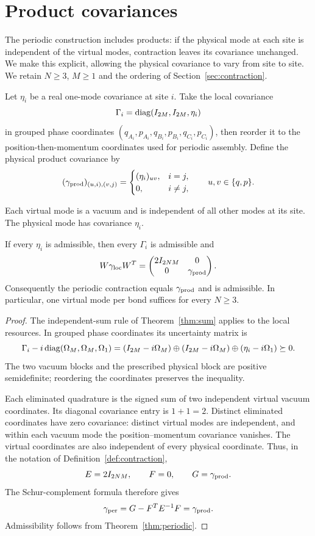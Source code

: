 \section{Product covariances}
\label{sec:products}
The periodic construction includes products: if the physical mode at each site
is independent of the virtual modes, contraction leaves its covariance unchanged.
We make this explicit, allowing the physical covariance to vary from site to site.
We retain $N\geq3$, $M\geq1$ and the ordering of Section~\ref{sec:contraction}.

\begin{definition}\label{def:product-resource}
Let $\eta_i$ be a real one-mode covariance at site $i$. Take the local covariance
\[
 \Gamma_i=\operatorname{diag}(I_{2M},I_{2M},\eta_i)
\]
in grouped phase coordinates $(q_{A_i},p_{A_i},q_{B_i},p_{B_i},q_{C_i},p_{C_i})$,
then reorder it to the position-then-momentum coordinates used for periodic
assembly. Define the physical product covariance by
\[
 (\gamma_{\rm prod})_{(u,i),(v,j)}=
 \begin{cases}(\eta_i)_{uv},&i=j,\\0,&i\ne j,\end{cases}
 \qquad u,v\in\{q,p\}.
\]
\end{definition}
Each virtual mode is a vacuum and is independent of all other modes at its site.
The physical mode has covariance $\eta_i$.

\begin{theorem}\label{thm:periodic-product}
If every $\eta_i$ is admissible, then every $\Gamma_i$ is admissible and
\[
 W\gamma_{\rm loc}W^T=
 \begin{pmatrix}2I_{2NM}&0\\0&\gamma_{\rm prod}\end{pmatrix}.
\]
Consequently the periodic contraction equals $\gamma_{\rm prod}$ and is
admissible. In particular, one virtual mode per bond suffices for every $N\geq3$.
\end{theorem}
\begin{proof}
The independent-sum rule of Theorem~\ref{thm:sum} applies to the local resources.
In grouped phase coordinates its uncertainty matrix is
\[
 \Gamma_i-i\operatorname{diag}(\Omega_M,\Omega_M,\Omega_1)
 = (I_{2M}-i\Omega_M)\oplus(I_{2M}-i\Omega_M)
       \oplus(\eta_i-i\Omega_1)\succeq0.
\]
The two vacuum blocks and the prescribed physical block are positive semidefinite;
reordering the coordinates preserves the inequality.

Each eliminated quadrature is the signed sum of two independent virtual vacuum
coordinates. Its diagonal covariance entry is $1+1=2$. Distinct eliminated
coordinates have zero covariance: distinct virtual modes are independent, and
within each vacuum mode the position--momentum covariance vanishes. The virtual
coordinates are also independent of every physical coordinate. Thus, in the
notation of Definition~\ref{def:contraction},
\[
 E=2I_{2NM},\qquad F=0,\qquad G=\gamma_{\rm prod}.
\]
The Schur-complement formula therefore gives
\[
 \gamma_{\rm per}=G-F^TE^{-1}F=\gamma_{\rm prod}.
\]
Admissibility follows from Theorem~\ref{thm:periodic}.
\end{proof}

